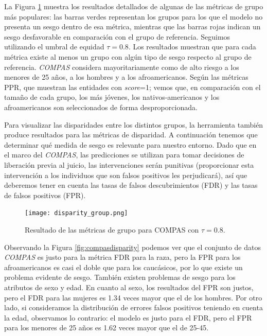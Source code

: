 La Figura \ref{fig:compasdgroup} muestra los resultados detallados de algunas de las métricas de grupo más populares: las barras verdes representan los grupos para los que el modelo no presenta un sesgo dentro de esa métrica, mientras que las barras rojas indican un sesgo desfavorable en comparación con el grupo de referencia. Seguimos utilizando el umbral de equidad $\tau = 0.8$. Los resultados muestran que para cada métrica existe al menos un grupo con algún tipo de sesgo respecto al grupo de referencia. \textit{COMPAS} considera mayoritariamente como de alto riesgo a los menores de 25 años, a los hombres y a los afroamericanos. Según las métricas PPR, que muestran las entidades con \textit{score}=1; vemos que, en comparación con el tamaño de cada grupo, los más jóvenes, los nativos-americanos y los afroamericanos son seleccionados de forma desproporcionada.

Para visualizar las disparidades entre los distintos grupos, la herramienta también produce resultados para las métricas de disparidad. A continuación tenemos que determinar qué medida de sesgo es relevante para nuestro entorno. Dado que en el marco del \textit{COMPAS}, las predicciones se utilizan para tomar decisiones de liberación previa al juicio, las intervenciones serán punitivas (proporcionar esta intervención a los individuos que son falsos positivos les perjudicará), así que deberemos tener en cuenta las tasas de falsos descubrimientos (FDR) y las tasas de falsos positivos (FPR).

\clearpage

\begin{figure}[h]
	\hspace{-2.5cm}
	\texttt{[image: disparity\_group.png]}
	\caption{Resultado de las métricas de grupo para COMPAS con $\tau=0.8$.}
    \label{fig:compasdgroup}
\end{figure}

Observando la Figura \ref{fig:compasdisparity} podemos ver que el conjunto de datos \textit{COMPAS} es justo para la métrica FDR para la raza, pero la FPR para los afroamericanos es casi el doble que para los caucásicos, por lo que existe un problema evidente de sesgo. También existen problemas de sesgo para los atributos de sexo y edad. En cuanto al sexo, los resultados del FPR son justos, pero el FDR para las mujeres es 1.34 veces mayor que el de los hombres. Por otro lado, si consideramos la distribución de errores falsos positivos teniendo en cuenta la edad, observamos lo contrario: el modelo es justo para el FDR, pero el FPR para los menores de 25 años es 1.62 veces mayor que el de 25-45.

